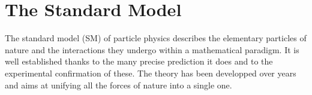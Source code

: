 \chapter{The Standard Model}
\label{chap:I-1-standard-model}

  The standard model (SM) of particle physics describes the elementary particles of nature and the interactions they undergo within a mathematical paradigm. It is well established thanks to the many precise prediction it does and to the experimental confirmation of these. The theory has been developped over years and aims at unifying all the forces of nature into a single one.
